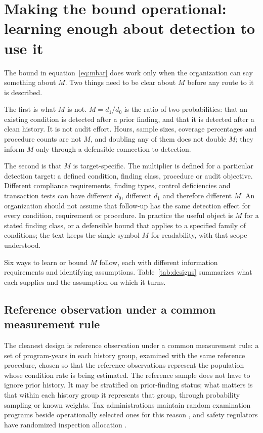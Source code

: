 \section{Making the bound operational: learning enough about detection to use it}\label{sec:operational}

The bound in equation~\eqref{eq:mbar} does work only when the organization can
say something about $M$. Two things need to be clear about $M$ before any
route to it is described.

The first is what $M$ is not. $M = d_1/d_0$ is the ratio of two
probabilities: that an existing condition is detected after a prior finding,
and that it is detected after a clean history. It is not audit effort. Hours,
sample sizes, coverage percentages and procedure counts are not $M$, and
doubling any of them does not double $M$; they inform $M$ only through a
defensible connection to detection.

The second is that $M$ is target-specific. The multiplier is defined for a
particular detection target: a defined condition, finding class, procedure or
audit objective. Different compliance requirements, finding types, control
deficiencies and transaction tests can have different $d_0$, different $d_1$
and therefore different $M$. An organization should not assume that follow-up
has the same detection effect for every condition, requirement or procedure.
In practice the useful object is $M$ for a stated finding class, or a
defensible bound that applies to a specified family of conditions; the text
keeps the single symbol $M$ for readability, with that scope understood.

Six ways to learn or bound $M$ follow, each with different information
requirements and identifying assumptions. Table~\ref{tab:designs} summarizes
what each supplies and the assumption on which it turns.

\subsection{Reference observation under a common measurement rule}

The cleanest design is reference observation under a common measurement rule:
a set of program-years in each history group, examined with the same
reference procedure, chosen so that the reference observations represent the
population whose condition rate is being estimated. The reference sample does
not have to ignore prior history. It may be stratified on prior-finding
status; what matters is that within each history group it represents that
group, through probability sampling or known weights. Tax administrations
maintain random examination programs beside operationally selected ones for
this reason \citep{slemrod2019}, and safety regulators have randomized
inspection allocation \citep{levine2012}.


